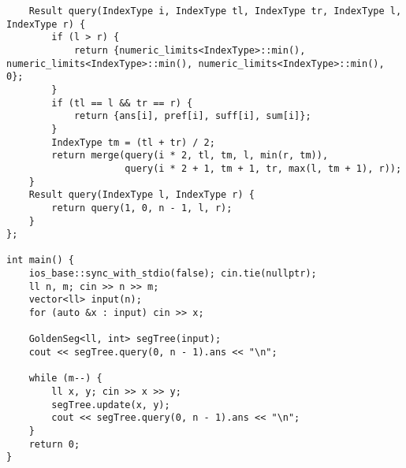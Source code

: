 \documentclass[landscape, 8pt, a4paper, oneside, twocolumn]{extarticle}
\begin{document}
\begin{verbatim}
    Result query(IndexType i, IndexType tl, IndexType tr, IndexType l, IndexType r) {
        if (l > r) {
            return {numeric_limits<IndexType>::min(), numeric_limits<IndexType>::min(), numeric_limits<IndexType>::min(), 0};
        }
        if (tl == l && tr == r) {
            return {ans[i], pref[i], suff[i], sum[i]};
        }
        IndexType tm = (tl + tr) / 2;
        return merge(query(i * 2, tl, tm, l, min(r, tm)),
                     query(i * 2 + 1, tm + 1, tr, max(l, tm + 1), r));
    }
    Result query(IndexType l, IndexType r) {
        return query(1, 0, n - 1, l, r);
    }
};

int main() {
    ios_base::sync_with_stdio(false); cin.tie(nullptr);
    ll n, m; cin >> n >> m;
    vector<ll> input(n);
    for (auto &x : input) cin >> x;

    GoldenSeg<ll, int> segTree(input);
    cout << segTree.query(0, n - 1).ans << "\n";

    while (m--) {
        ll x, y; cin >> x >> y;
        segTree.update(x, y);
        cout << segTree.query(0, n - 1).ans << "\n";
    }
    return 0;
}
    \end{verbatim}
\end{document}
